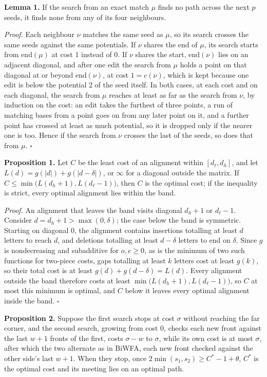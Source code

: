 \documentclass[10pt]{article}
\begin{document}
\textbf{Lemma 1.} If the search from an exact match \(\mu\) finds no path across the next \(p\) seeds, it finds none from any of its four neighbours.

\emph{Proof.} Each neighbour \(\nu\) matches the same seed as \(\mu\), so its search crosses the same seeds against the same potentials. If \(\nu\) shares the end of \(\mu\), its search starts from \(\mathrm{end}(\mu)\) at cost 1 instead of 0. If \(\nu\) shares the start, \(\mathrm{end}(\nu)\) lies on an adjacent diagonal, and after one edit the search from \(\mu\) holds a point on that diagonal at or beyond \(\mathrm{end}(\nu)\), at cost \(1 = c(\nu)\), which is kept because one edit is below the potential 2 of the seed itself. In both cases, at each cost and on each diagonal, the search from \(\mu\) reaches at least as far as the search from \(\nu\), by induction on the cost: an edit takes the furthest of three points, a run of matching bases from a point goes on from any later point on it, and a further point has crossed at least as much potential, so it is dropped only if the nearer one is too. Hence if the search from \(\nu\) crosses the last of the seeds, so does that from \(\mu\). \(\square\)

\textbf{Proposition 1.} Let \(C\) be the least cost of an alignment within \([d_\ell, d_h]\), and let \(L(d) = g(|d|) + g(|d-\delta|)\), or \(\infty\) for a diagonal outside the matrix. If \(C \le \min\bigl(L(d_h+1), L(d_\ell-1)\bigr)\), then \(C\) is the optimal cost; if the inequality is strict, every optimal alignment lies within the band.

\emph{Proof.} An alignment that leaves the band visits diagonal \(d_h+1\) or \(d_\ell-1\). Consider \(d=d_h+1 > \max(0,\delta)\); the case below the band is symmetric. Starting on diagonal 0, the alignment contains insertions totalling at least \(d\) letters to reach \(d\), and deletions totalling at least \(d-\delta\) letters to end on \(\delta\). Since \(g\) is nondecreasing and subadditive for \(o, e \ge 0\), as is the minimum of two such functions for two-piece costs, gaps totalling at least \(k\) letters cost at least \(g(k)\), so their total cost is at least \(g(d)+g(d-\delta)=L(d)\). Every alignment outside the band therefore costs at least \(\min\bigl(L(d_h+1), L(d_\ell-1)\bigr)\), so \(C\) at most this minimum is optimal, and \(C\) below it leaves every optimal alignment inside the band. \(\square\)

\textbf{Proposition 2.} Suppose the first search stops at cost \(\sigma\) without reaching the far corner, and the second search, growing from cost 0, checks each new front against the last \(w+1\) fronts of the first, costs \(\sigma-w\) to \(\sigma\), while its own cost is at most \(\sigma\), after which the two alternate as in BiWFA, each new front checked against the other side's last \(w+1\). When they stop, once \(2\min(s_1, s_2) \ge C^* - 1 + \theta\), \(C^*\) is the optimal cost and its meeting lies on an optimal path.
\end{document}
